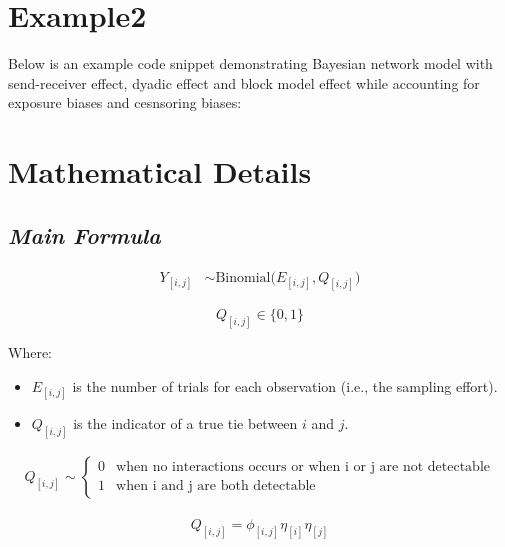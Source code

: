 \documentclass[
  letterpaper,
  DIV=11,
  numbers=noendperiod]{scrreprt}
\newenvironment{Shaded}{\begin{snugshade}}{\end{snugshade}}
\providecommand{\tightlist}{%
  \setlength{\itemsep}{0pt}\setlength{\parskip}{0pt}}\usepackage{longtable,booktabs,array}
\begin{document}
\section{Example2}\label{example2}

Below is an example code snippet demonstrating Bayesian network model
with send-receiver effect, dyadic effect and block model effect while
accounting for exposure biases and cesnsoring biases:

\begin{Shaded}
\begin{Highlighting}[]

\end{Highlighting}
\end{Shaded}

\section{Mathematical Details}\label{mathematical-details-20}

\subsection{\texorpdfstring{\emph{Main
Formula}}{Main Formula}}\label{main-formula-2}

\[
\begin{align}
    Y_{[i,j]} &\sim \mathrm{Binomial}\Big(E_{[i,j]}, Q_{[i,j]}  \Big)
\end{align}
\]

\[
Q_{[i,j]} \in \{0,1\} 
\]

Where:

\begin{itemize}
\tightlist
\item
  \(E_{[i,j]}\) is the number of trials for each observation (i.e., the
  sampling effort).
\item
  \(Q_{[i,j]}\) is the indicator of a true tie between \(i\) and \(j\).
\end{itemize}

\[
\begin{aligned}
Q_{[i,j]} \sim \begin{cases} 
0 & \text{when no interactions occurs or when i or j are not detectable} \\
\text{1}  & \text{when i and j are both detectable}
\end{cases}
\end{aligned}
\]

\[
\begin{align}
  Q_{[i,j]}= \phi_{[i,j]}\eta_{[i]}\eta_{[j]}
\end{align}
\]
\end{document}
